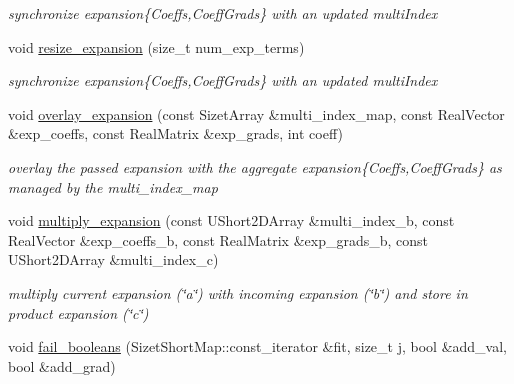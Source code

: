 \begin{DoxyCompactItemize}
\begin{DoxyCompactList}\small\item\em synchronize expansion\{Coeffs,Coeff\+Grads\} with an updated multi\+Index \end{DoxyCompactList}\item 
void \hyperlink{classPecos_1_1OrthogPolyApproximation_a5a7788b54991f0fa67d94eab7e9ef2a4}{resize\+\_\+expansion} (size\+\_\+t num\+\_\+exp\+\_\+terms)\label{classPecos_1_1OrthogPolyApproximation_a5a7788b54991f0fa67d94eab7e9ef2a4}

\begin{DoxyCompactList}\small\item\em synchronize expansion\{Coeffs,Coeff\+Grads\} with an updated multi\+Index \end{DoxyCompactList}\item 
void \hyperlink{classPecos_1_1OrthogPolyApproximation_a13c9bb4f0e799548d14f99a386bd34bb}{overlay\+\_\+expansion} (const Sizet\+Array \&multi\+\_\+index\+\_\+map, const Real\+Vector \&exp\+\_\+coeffs, const Real\+Matrix \&exp\+\_\+grads, int coeff)\label{classPecos_1_1OrthogPolyApproximation_a13c9bb4f0e799548d14f99a386bd34bb}

\begin{DoxyCompactList}\small\item\em overlay the passed expansion with the aggregate expansion\{Coeffs,Coeff\+Grads\} as managed by the multi\+\_\+index\+\_\+map \end{DoxyCompactList}\item 
void \hyperlink{classPecos_1_1OrthogPolyApproximation_ac55b330e5744fa8285ccae30dc691b13}{multiply\+\_\+expansion} (const U\+Short2\+D\+Array \&multi\+\_\+index\+\_\+b, const Real\+Vector \&exp\+\_\+coeffs\+\_\+b, const Real\+Matrix \&exp\+\_\+grads\+\_\+b, const U\+Short2\+D\+Array \&multi\+\_\+index\+\_\+c)\label{classPecos_1_1OrthogPolyApproximation_ac55b330e5744fa8285ccae30dc691b13}

\begin{DoxyCompactList}\small\item\em multiply current expansion (\char`\"{}a\char`\"{}) with incoming expansion (\char`\"{}b\char`\"{}) and store in product expansion (\char`\"{}c\char`\"{}) \end{DoxyCompactList}\item 
void \hyperlink{classPecos_1_1OrthogPolyApproximation_af98a9d8fd7b1b89052ce747c0ef483e4}{fail\+\_\+booleans} (Sizet\+Short\+Map\+::const\+\_\+iterator \&fit, size\+\_\+t j, bool \&add\+\_\+val, bool \&add\+\_\+grad)\label{classPecos_1_1OrthogPolyApproximation_af98a9d8fd7b1b89052ce747c0ef483e4}


\end{DoxyCompactItemize}
